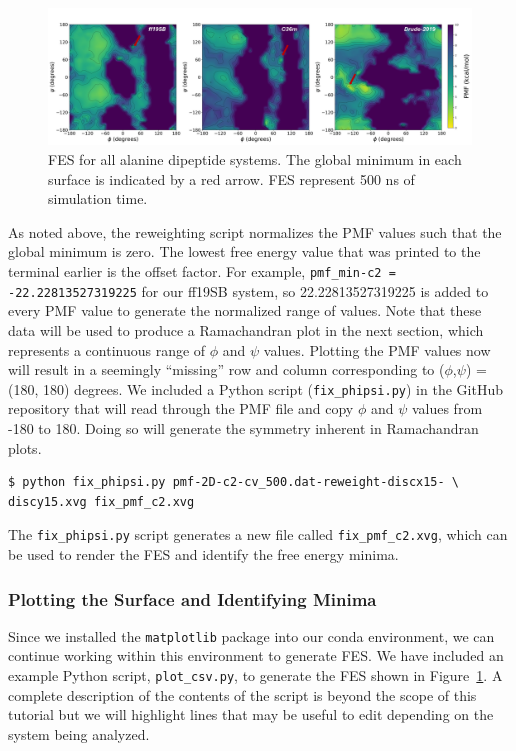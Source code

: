 \documentclass[9pt,tutorial]{livecoms}
\begin{document}
\begin{figure}[t]
    \includegraphics[scale=0.68]{main_figs/alad_allfes_500.png}
    \caption{FES for all alanine dipeptide systems. The global minimum in each surface is indicated by a red arrow. FES represent 500 ns of simulation time.}
    \label{fig:alad_allffs}
\end{figure}

As noted above, the reweighting script normalizes the PMF values such that the global minimum is zero. The lowest free energy value that was printed to the terminal earlier is the offset factor. For example, \texttt{pmf\_min-c2 = -22.22813527319225} for our ff19SB system, so 22.22813527319225 is added to every PMF value to generate the normalized range of values. Note that these data will be used to produce a Ramachandran plot in the next section, which represents a continuous range of $\phi$ and $\psi$ values. Plotting the PMF values now will result in a seemingly ``missing'' row and column corresponding to ($\phi$,$\psi$) = (180, 180) degrees. We included a Python script (\texttt{fix\_phipsi.py}) in the GitHub repository that will read through the PMF file and copy $\phi$ and $\psi$ values from -180 to 180. Doing so will generate the symmetry inherent in Ramachandran plots. 

\begin{lstlisting}[style=MyBash]
$ python fix_phipsi.py pmf-2D-c2-cv_500.dat-reweight-discx15- \
discy15.xvg fix_pmf_c2.xvg
\end{lstlisting}

The \texttt{fix\_phipsi.py} script generates a new file called \texttt{fix\_pmf\_c2.xvg}, which can be used to render the FES and identify the free energy minima. 

\subsubsection{Plotting the Surface and Identifying Minima}
Since we installed the \texttt{matplotlib} package into our conda environment, we can continue working within this environment to generate FES. We have included an example Python script, \texttt{plot\_csv.py}, to generate the FES shown in Figure~\ref{fig:alad_allffs}. A complete description of the contents of the script is beyond the scope of this tutorial but we will highlight lines that may be useful to edit depending on the system being analyzed. 
\end{document}
